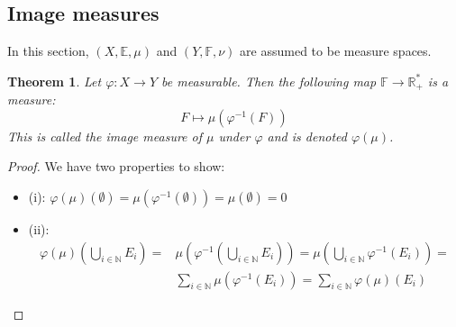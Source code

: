 \documentclass[12pt, a4paper]{article}
\newtheorem{theorem}{Theorem}[section]
\numberwithin{equation}{section}
\begin{document}
\subsection{Image measures}
In this section, $(X,\mathbb{E},\mu)$ and $(Y,\mathbb{F},\nu)$ are assumed to be measure spaces.

\begin{theorem}
Let $\varphi: X\rightarrow Y$ be measurable. Then the following map $\mathbb{F}\rightarrow\mathbb{R}^*_+$ is a measure:
\begin{equation}
F\mapsto\mu(\varphi^{-1}(F))
\end{equation}
This is called the image measure of $\mu$ under $\varphi$ and is denoted $\varphi(\mu)$.
\end{theorem}
\begin{proof}
We have two properties to show:
\begin{itemize}
\item (i): $\varphi(\mu)(\emptyset)=\mu(\varphi^{-1}(\emptyset))=\mu(\emptyset)=0$
\item (ii):
\begin{align*}
\varphi(\mu)\left(\bigcup_{i\in\mathbb{N}}E_i\right)=&\mu\left(\varphi^{-1}\left(\bigcup_{i\in\mathbb{N}}E_i\right)\right)=\mu\left(\bigcup_{i\in\mathbb{N}}\varphi^{-1}(E_i)\right)=\\
&\sum_{i\in\mathbb{N}}\mu(\varphi^{-1}(E_i))=\sum_{i\in\mathbb{N}}\varphi(\mu)(E_i)
\end{align*}
\end{itemize}
\end{proof}
\end{document}
